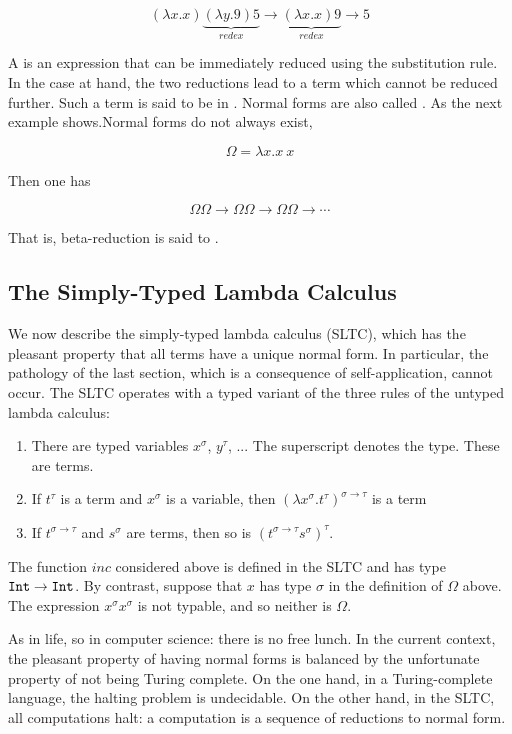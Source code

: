$$
(\lambda x.x)\underbrace{(\lambda y.9)5}_{redex} \to \underbrace{(\lambda x.x)9}_{redex} \to 5
$$

A  is an expression that can be immediately reduced using the substitution rule. In the case at hand, the two reductions lead to a term which cannot be reduced further. Such a term is said to be in . Normal forms are also called . As the next example shows.Normal forms do not always exist,  

$$
\Omega = \lambda x. x\ x
$$

Then one has 

$$
\Omega \Omega \to \Omega \Omega \to \Omega \Omega \to  \cdots
$$

That is, beta-reduction is said to .

\subsection{The Simply-Typed Lambda Calculus}

We now describe the simply-typed lambda calculus (SLTC), which has the pleasant property that all terms have a unique normal form.  In particular, the pathology of the last section, which is a consequence of self-application, cannot occur.  The SLTC operates with a typed variant of the three rules of the untyped lambda calculus:

\begin{enumerate}

\item There are typed variables $x^\sigma$, $y^\tau$, ...  The superscript denotes the type. These are terms.

\item If $t^\tau$ is a term and $x^\sigma$ is a variable, then $(\lambda x^\sigma.t^\tau)^{\sigma \to \tau}$ is a term

\item If $t^{\sigma \to \tau}$ and $s^\sigma$ are terms, then so is $(t^{\sigma \to \tau} s^\sigma)^\tau$.

\end{enumerate}

The function $inc$ considered above is defined in the SLTC and has type ${\tt Int} \to {\tt Int}$.  By contrast, suppose that $x$ has type $\sigma$ in the definition of $\Omega$ above.  The expression $x^\sigma x^\sigma$ is not typable, and so neither is $\Omega$.

As in life, so in computer science: there is no free lunch.  In the current context, the pleasant property of having normal forms is balanced by the unfortunate property of not being Turing complete.  On the one hand, in a Turing-complete language, the halting problem is undecidable.  On the other hand, in the SLTC, all computations halt: a computation is a sequence of reductions to normal form.

